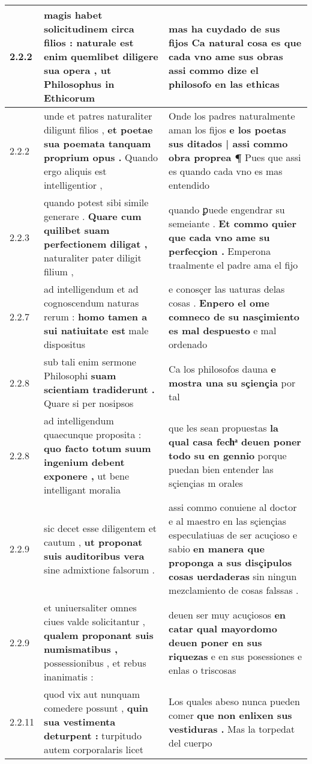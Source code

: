 \begin{tabular}{|p{1cm}|p{6.5cm}|p{6.5cm}|}
2.2.2 & magis habet solicitudinem circa filios : \textbf{ naturale est enim quemlibet diligere sua opera , } ut Philosophus in Ethicorum & mas ha cuydado de sus fijos \textbf{ Ca natural cosa es que cada vno ame sus obras } assi commo dize el philosofo en las ethicas \\\hline
2.2.2 & unde et patres naturaliter diligunt filios , \textbf{ et poetae sua poemata tanquam proprium opus . } Quando ergo aliquis est intelligentior , & Onde los padres naturalmente aman los fijos \textbf{ e los poetas sus ditados | assi commo obra proprea ¶ } Pues que assi es quando cada vno es mas entendido \\\hline
2.2.3 & quando potest sibi simile generare . \textbf{ Quare cum quilibet suam perfectionem diligat , } naturaliter pater diligit filium , & quando ꝑuede engendrar su semeiante . \textbf{ Et commo quier que cada vno ame su perfecçion . } Emperona traalmente el padre ama el fijo \\\hline
2.2.7 & ad intelligendum et ad cognoscendum naturas rerum : \textbf{ homo tamen a sui natiuitate est } male dispositus & e conosçer las uaturas delas cosas . \textbf{ Enpero el ome comneco de su nasçimiento es mal despuesto } e mal ordenado \\\hline
2.2.8 & sub tali enim sermone Philosophi \textbf{ suam scientiam tradiderunt . } Quare si per nosipsos & Ca los philosofos dauna \textbf{ e mostra una su sçiençia } por tal \\\hline
2.2.8 & ad intelligendum quaecunque proposita : \textbf{ quo facto totum suum ingenium debent exponere , } ut bene intelligant moralia & que les sean propuestas \textbf{ la qual casa fechͣ deuen poner todo su en gennio } porque puedan bien entender las sçiençias m orales \\\hline
2.2.9 & sic decet esse diligentem et cautum , \textbf{ ut proponat suis auditoribus vera } sine admixtione falsorum . & assi commo conuiene al doctor e al maestro en las sçiençias especulatiuas de ser acuçioso e sabio \textbf{ en manera que proponga a sus disçipulos cosas uerdaderas } sin ningun mezclamiento de cosas falssas . \\\hline
2.2.9 & et uniuersaliter omnes ciues valde solicitantur , \textbf{ qualem proponant suis numismatibus , } possessionibus , et rebus inanimatis : & deuen ser muy acuçiosos \textbf{ en catar qual mayordomo deuen poner en sus riquezas } e en sus posessiones e enlas o triscosas \\\hline
2.2.11 & quod vix aut nunquam comedere possunt , \textbf{ quin sua vestimenta deturpent : } turpitudo autem corporalaris licet & Los quales abeso nunca pueden comer \textbf{ que non enlixen sus vestiduras . } Mas la torpedat del cuerpo \\\hline

\end{tabular}
